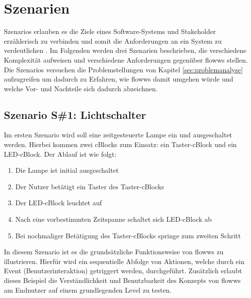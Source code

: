 \section{Szenarien}\label{sec:szenarien}
Szenarios erlauben es die Ziele eines Software-Systems und Stakeholder erzählerisch zu verbinden und somit die Anforderungen an ein System zu verdeutlichen \cite{Lamsweerde2001scenario}. Im Folgenden werden drei Szenarien beschrieben, die verschiedene Komplexität aufweisen und verschiedene Anforderungen gegenüber flowws stellen. Die Szenarios versuchen die Problemstellungen von Kapitel \ref{sec:problemanalyse} aufzugreifen um dadurch zu Erfahren, wie flowws damit umgehen würde und welche Vor- und Nachteile sich dadurch abzeichnen. 

\subsection{Szenario S\#1: Lichtschalter\label{szenario1}}
Im ersten Szenario wird soll eine zeitgesteuerte Lampe ein und ausgeschaltet werden. Hierbei kommen zwei cBlocks zum Einsatz: ein Taster-cBlock und ein LED-cBlock. Der Ablauf ist wie folgt:
\begin{enumerate}
    \item Die Lampe ist initial ausgeschaltet
    \item Der Nutzer betätigt ein Taster des Taster-cBlocks
    \item Der LED-cBlock leuchtet auf
    \item Nach eine vorbestimmten Zeitspanne schaltet sich LED-cBlock ab
    \item Bei nochmaliger Betätigung des Taster-cBlocks springe zum zweiten Schritt
\end{enumerate}
In diesem Szenario ist es die grundsätzliche Funktionsweise von flowws zu illustrieren. Hierfür wird ein sequentielle Abfolge von Aktionen, welche durch ein Event (Benutzerinteraktion) getriggert werden, durchgeführt. Zusätzlich erlaubt dieses Beispiel die Verständlichkeit und Benutzbarkeit des Konzepts von flowws am Endnutzer auf einem grundlegenden Level zu testen.

